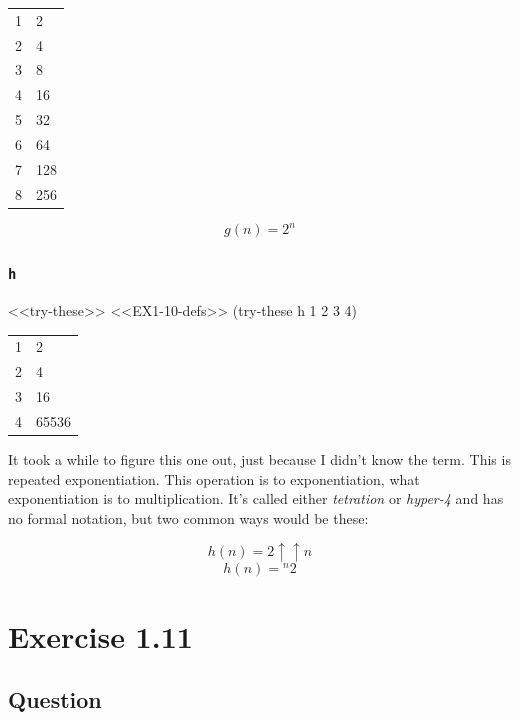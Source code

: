 \documentclass[
]{article}
\newenvironment{Shaded}{}{}
\newcommand{\DecValTok}[1]{\textcolor[rgb]{0.25,0.63,0.44}{#1}}
\newcommand{\NormalTok}[1]{#1}
\begin{document}
\begin{longtable}[]{@{}ll@{}}
\toprule
\endhead
1 & 2 \\
2 & 4 \\
3 & 8 \\
4 & 16 \\
5 & 32 \\
6 & 64 \\
7 & 128 \\
8 & 256 \\
\bottomrule
\end{longtable}

\[
g(n)=2^n
\]

\hypertarget{h}{%
\subsubsection{\texorpdfstring{\texttt{h}}{h}}\label{h}}

\begin{Shaded}
\begin{Highlighting}[numbers=left,,]
\NormalTok{\textless{}\textless{}try{-}these\textgreater{}\textgreater{}}
\NormalTok{\textless{}\textless{}EX1{-}10{-}defs\textgreater{}\textgreater{}}
\NormalTok{(try{-}these h }\DecValTok{1} \DecValTok{2} \DecValTok{3} \DecValTok{4}\NormalTok{)}
\end{Highlighting}
\end{Shaded}

\begin{longtable}[]{@{}ll@{}}
\toprule
\endhead
1 & 2 \\
2 & 4 \\
3 & 16 \\
4 & 65536 \\
\bottomrule
\end{longtable}

It took a while to figure this one out, just because I didn't know the
term. This is repeated exponentiation. This operation is to
exponentiation, what exponentiation is to multiplication. It's called
either \emph{tetration} or \emph{hyper-4} and has no formal notation,
but two common ways would be these:

\[
h(n)=2 \uparrow\uparrow n
\] \[
h(n)={}^{n}2
\]

\hypertarget{exercise-1.11}{%
\section{Exercise 1.11}\label{exercise-1.11}}

\hypertarget{question-10}{%
\subsection{Question}\label{question-10}}
\end{document}
